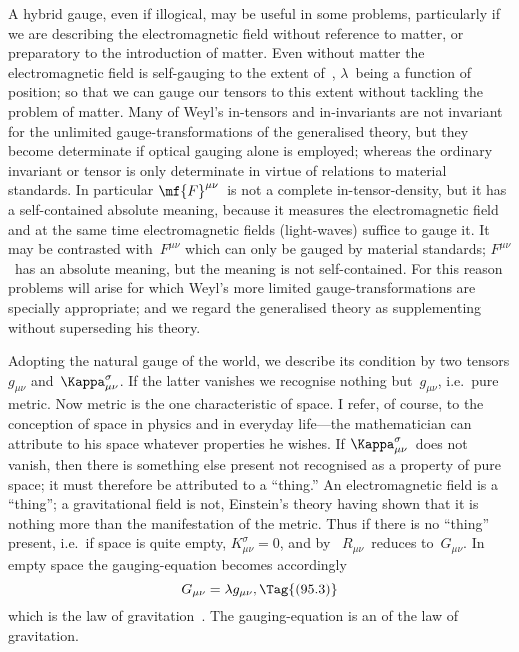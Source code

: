\documentclass[12pt]{book}
\begin{document}
A hybrid gauge, even if illogical, may be useful in some problems, particularly
if we are describing the electromagnetic field without reference to
matter, or preparatory to the introduction of matter. Even without matter
the electromagnetic field is self-gauging to the extent of~, $\lambda$~being a
function of position; so that we can gauge our tensors to this extent without
tackling the problem of matter. Many of Weyl's in\hyp{}tensors and in\hyp{}invariants
are not invariant for the unlimited gauge\hyp{}transformations of the generalised
theory, but they become determinate if optical gauging alone is employed;
whereas the ordinary invariant or tensor is only determinate in virtue of
relations to material standards. In particular $\mf{F}^{\mu\nu}$~is not a complete in\hyp{}tensor\hyp{}density,
but it has a self\hyp{}contained absolute meaning, because it measures the
electromagnetic field and at the same time electromagnetic fields (light-waves)
suffice to gauge it. It may be contrasted with~$F^{\mu\nu}$ which can only be gauged
by material standards; $F^{\mu\nu}$~has an absolute meaning, but the meaning is not
self\hyp{}contained. For this reason problems will arise for which Weyl's more
limited gauge\hyp{}transformations are specially appropriate; and we regard the
generalised theory as supplementing without superseding his theory.

Adopting the natural gauge of the world, we describe its condition by
%
two tensors $g_{\mu\nu}$ and~$\Kappa_{\mu\nu}^{\sigma}$. If the latter vanishes we recognise nothing but~$g_{\mu\nu}$,
i.e.\ pure metric. Now metric is the one characteristic of space. I refer, of
%
course, to the conception of space in physics and in everyday life---the mathematician
can attribute to his space whatever properties he wishes. If $\Kappa_{\mu\nu}^{\sigma}$~does
not vanish, then there is something else present not recognised as a property
%
of pure space; it must therefore be attributed to a ``thing\footnotemark.''\footnotetext
  {An electromagnetic field is a ``thing''; a gravitational field is not, Einstein's theory having
  shown that it is nothing more than the manifestation of the metric.}
Thus if there
is no ``thing'' present, i.e.\ if space is quite empty, $K_{\mu\nu}^{\sigma} = 0$, and by~ $R_{\mu\nu}$~reduces
to~$G_{\mu\nu}$. In empty space the gauging-equation becomes accordingly
%
\[
G_{\mu\nu} = \lambda g_{\mu\nu},
\Tag{(95.3)}
\]
which is the law of gravitation~. The gauging-equation is an  of the
law of gravitation.
\end{document}
